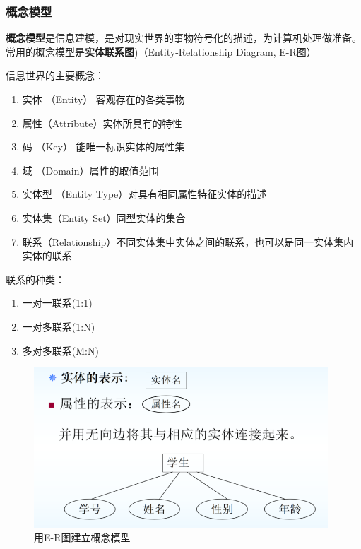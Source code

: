 \documentclass{article}
\begin{document}
\subsubsection{概念模型}

\textbf{概念模型}是信息建模，是对现实世界的事物符号化的描述，为计算机处理做准备。常用的概念模型是\textbf{实体联系图})（Entity-Relationship Diagram, E-R图）


信息世界的主要概念：

\begin{enumerate}
    \item 实体 （Entity） 客观存在的各类事物
    \item 属性（Attribute）实体所具有的特性
    \item 码 （Key） 能唯一标识实体的属性集
    \item 域 （Domain）属性的取值范围
    \item 实体型 （Entity Type）对具有相同属性特征实体的描述
    \item 实体集（Entity Set）同型实体的集合
    \item 联系（Relationship）不同实体集中实体之间的联系，也可以是同一实体集内实体的联系
\end{enumerate}

联系的种类：
\begin{enumerate}
    \item 一对一联系(1:1)
    \item 一对多联系(1:N)
    \item 多对多联系(M:N)
\end{enumerate}


\begin{figure}[H]
    
    \centering
    \includegraphics*[height = 6cm]{img/1.2-2.png}
    \caption{用E-R图建立概念模型}
\end{figure}
\end{document}
